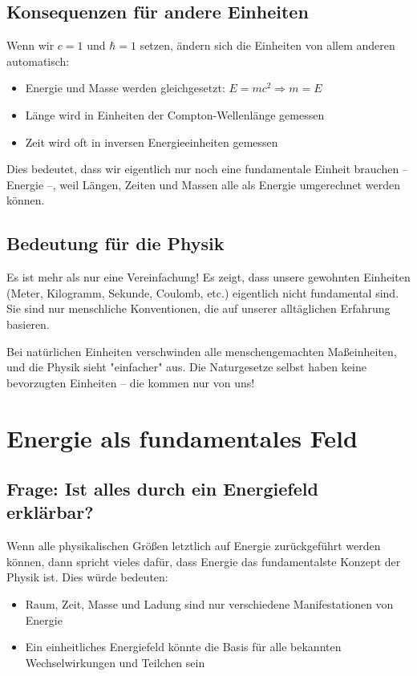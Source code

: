 \documentclass{article}
\begin{document}
\subsection{Konsequenzen für andere Einheiten}
Wenn wir $c = 1$ und $\hbar = 1$ setzen, ändern sich die Einheiten von allem anderen automatisch:

\begin{itemize}
	\item Energie und Masse werden gleichgesetzt: $E = mc^2 \Rightarrow m = E$
	\item Länge wird in Einheiten der Compton-Wellenlänge gemessen
	\item Zeit wird oft in inversen Energieeinheiten gemessen
\end{itemize}

Dies bedeutet, dass wir eigentlich nur noch eine fundamentale Einheit brauchen – Energie –, weil Längen, Zeiten und Massen alle als Energie umgerechnet werden können.

\subsection{Bedeutung für die Physik}
Es ist mehr als nur eine Vereinfachung! Es zeigt, dass unsere gewohnten Einheiten (Meter, Kilogramm, Sekunde, Coulomb, etc.) eigentlich nicht fundamental sind. Sie sind nur menschliche Konventionen, die auf unserer alltäglichen Erfahrung basieren.

Bei natürlichen Einheiten verschwinden alle menschengemachten Maßeinheiten, und die Physik sieht "einfacher" aus. Die Naturgesetze selbst haben keine bevorzugten Einheiten – die kommen nur von uns!

\section{Energie als fundamentales Feld}

\subsection{Frage: Ist alles durch ein Energiefeld erklärbar?}

Wenn alle physikalischen Größen letztlich auf Energie zurückgeführt werden können, dann spricht vieles dafür, dass Energie das fundamentalste Konzept der Physik ist. Dies würde bedeuten:

\begin{itemize}
	\item Raum, Zeit, Masse und Ladung sind nur verschiedene Manifestationen von Energie
	\item Ein einheitliches Energiefeld könnte die Basis für alle bekannten Wechselwirkungen und Teilchen sein
\end{itemize}
\end{document}
